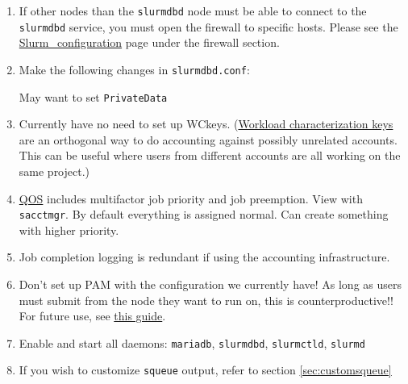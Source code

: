 \begin{enumerate}
  \item If other nodes than the \texttt{slurmdbd} node must be able to connect to the \texttt{slurmdbd} service, you must open the firewall to specific hosts. Please see the \href{https://wiki.fysik.dtu.dk/niflheim/Slurm_configuration}{Slurm\_configuration} page under the firewall section.

  \item Make the following changes in \texttt{slurmdbd.conf}:

    May want to set \texttt{PrivateData}

  \item Currently have no need to set up WCkeys. (\href{https://slurm.schedmd.com/wckey.html}{Workload characterization keys} are an orthogonal way to do accounting against possibly unrelated accounts. This can be useful where users from different accounts are all working on the same project.)

  \item \href{https://slurm.schedmd.com/qos.html}{QOS} includes multifactor job priority and job preemption. View with \texttt{sacctmgr}. By default everything is assigned normal. Can create something with higher priority.

  \item Job completion logging is redundant if using the accounting infrastructure.

  \item Don't set up PAM with the configuration we currently have! As long as users must submit from the node they want to run on, this is counterproductive!! For future use, see \href{https://wiki.fysik.dtu.dk/niflheim/Slurm_configuration#pam-module-restrictions}{this guide}.

  \item Enable and start all daemons: \texttt{mariadb}, \texttt{slurmdbd}, \texttt{slurmctld}, \texttt{slurmd}

  \item If you wish to customize \texttt{squeue} output, refer to section \ref{sec:customsqueue}
\end{enumerate}

